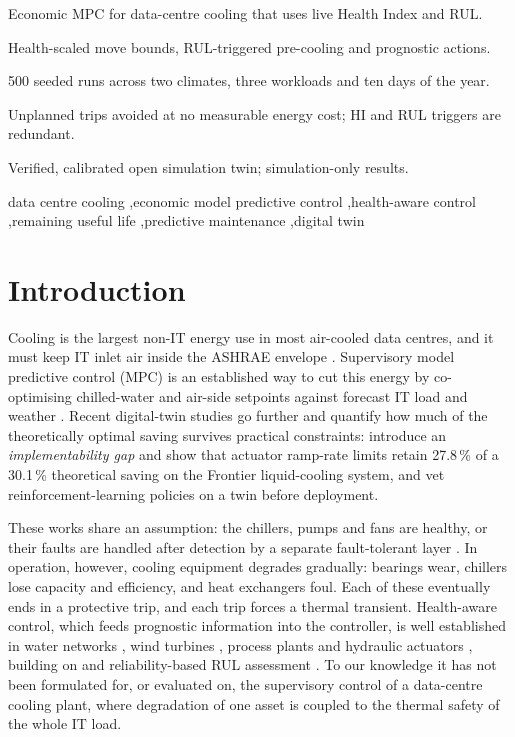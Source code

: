 \documentclass[preprint,12pt,authoryear]{elsarticle}
\begin{document}
\begin{frontmatter}
\begin{highlights}
\item Economic MPC for data-centre cooling that uses live Health Index and RUL.
\item Health-scaled move bounds, RUL-triggered pre-cooling and prognostic actions.
\item 500 seeded runs across two climates, three workloads and ten days of the year.
\item Unplanned trips avoided at no measurable energy cost; HI and RUL triggers are redundant.
\item Verified, calibrated open simulation twin; simulation-only results.
\end{highlights}

\begin{keyword}
data centre cooling \sep economic model predictive control \sep health-aware control \sep remaining useful life \sep predictive maintenance \sep digital twin
\end{keyword}
\end{frontmatter}

\linenumbers

\section{Introduction}\label{sec:intro}
Cooling is the largest non-IT energy use in most air-cooled data centres, and it must keep IT inlet air inside the ASHRAE envelope \citep{ASHRAETC99}. Supervisory model predictive control (MPC) is an established way to cut this energy by co-optimising chilled-water and air-side setpoints against forecast IT load and weather \citep{Lazic2018,Fan2023WSE,Boldocky2026MIDPC}. Recent digital-twin studies go further and quantify how much of the theoretically optimal saving survives practical constraints: \citet{Jadhav2026DT} introduce an \emph{implementability gap} and show that actuator ramp-rate limits retain 27.8\,\% of a 30.1\,\% theoretical saving on the Frontier liquid-cooling system, and \citet{Zhang2026DCVerse} vet reinforcement-learning policies on a twin before deployment.

These works share an assumption: the chillers, pumps and fans are healthy, or their faults are handled after detection by a separate fault-tolerant layer \citep{Kheradmandi2020FTC}. In operation, however, cooling equipment degrades gradually: bearings wear, chillers lose capacity and efficiency, and heat exchangers foul. Each of these eventually ends in a protective trip, and each trip forces a thermal transient. Health-aware control, which feeds prognostic information into the controller, is well established in water networks \citep{Grosso2016RBEMPC}, wind turbines \citep{Sanchez2017HAMPC}, process plants \citep{Matias2025HAC} and hydraulic actuators \citep{Kaki2026EHA}, building on \citet{Escobet2012HAC} and reliability-based RUL assessment \citep{KarimiPour2018LPV}. To our knowledge it has not been formulated for, or evaluated on, the supervisory control of a data-centre cooling plant, where degradation of one asset is coupled to the thermal safety of the whole IT load.
\end{document}
